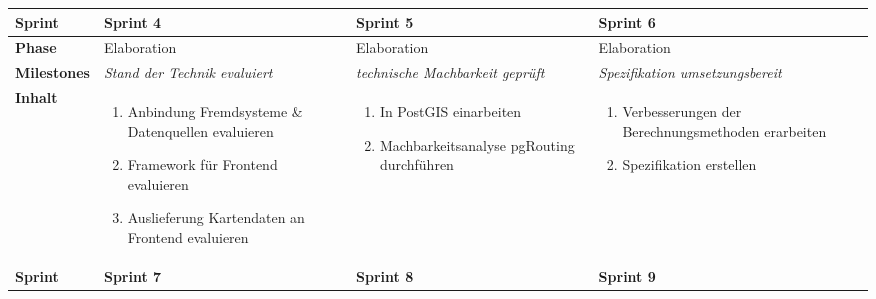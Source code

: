 \begin{landscape}
\begin{longtable}{l p{6.5cm} p{6.5cm} p{6.5cm}}
        \toprule
        \textbf{Sprint}
                                & \textbf{Sprint 4}
                                & \textbf{Sprint 5}
                                & \textbf{Sprint 6} \\
        \midrule
        \textbf{Phase}
                                & Elaboration
                                & Elaboration
                                & Elaboration \\

        \textbf{Milestones}
                                & \textit{Stand der Technik evaluiert}
                                & \textit{technische Machbarkeit geprüft}
                                & \textit{Spezifikation umsetzungsbereit}  \\

        \textbf{Inhalt}
                                & \begin{enumerate}[noitemsep]
                                    \item Anbindung Fremdsysteme \& Datenquellen evaluieren
                                    \item Framework für Frontend evaluieren
                                    \item Auslieferung Kartendaten an Frontend evaluieren
                                \end{enumerate}
                                & \begin{enumerate}[noitemsep]
                                    \item In PostGIS einarbeiten
                                    \item Machbarkeitsanalyse pgRouting durchführen
                                \end{enumerate}
                                & \begin{enumerate}[noitemsep]
                                    \item Verbesserungen der Berechnungsmethoden erarbeiten
                                    \item Spezifikation erstellen
                                \end{enumerate}  \\

        \pagebreak
        \toprule
        \textbf{Sprint}
                                & \textbf{Sprint 7}
                                & \textbf{Sprint 8}
                                & \textbf{Sprint 9} \\


\end{longtable}
\end{landscape}
